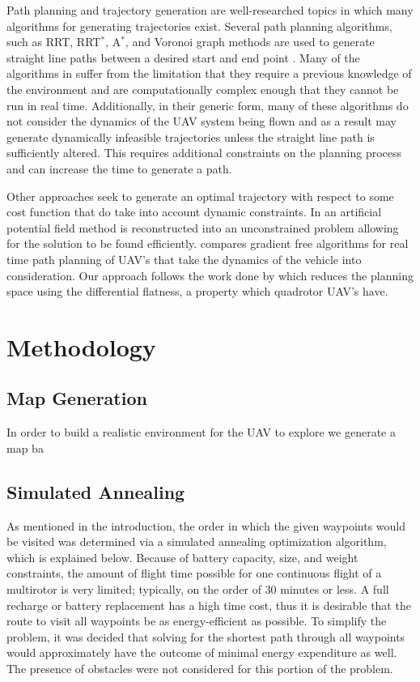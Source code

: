 \documentclass[letterpaper,conference, 10pt]{ieeeconf}
\begin{document}
Path planning and trajectory generation are well-researched topics in which many algorithms for generating trajectories exist. Several path planning algorithms, such as RRT, RRT$^*$, A$^*$, and Voronoi graph methods are used to generate straight line paths between a desired start and end point \cite{goerzen2010survey}. Many of the algorithms in \cite{goerzen2010survey} suffer from the limitation that they require a previous knowledge of the environment and are computationally complex enough that they cannot be run in real time. Additionally, in their generic form, many of these algorithms do not consider the dynamics of the UAV system being flown and as a result may generate dynamically infeasible trajectories unless the straight line path is sufficiently altered. This requires additional constraints on the planning process and can increase the time to generate a path.

Other approaches seek to generate an optimal trajectory with respect to some cost function that do take into account dynamic constraints. In \cite{chen2016uav} an artificial potential field method is reconstructed into an unconstrained problem allowing for the solution to be found efficiently. \cite{roberge2012comparison} compares gradient free algorithms for real time path planning of UAV's that take the dynamics of the vehicle into consideration. Our approach follows the work done by \cite{mellinger2011minimum} which reduces the planning space using the differential flatness, a property which quadrotor UAV's have.

\section{Methodology}
\label{section:methods}

\subsection{Map Generation}
In order to build a realistic environment for the UAV to explore we generate a map ba

\subsection{Simulated Annealing}
As mentioned in the introduction, the order in which the given waypoints would be visited was determined via a simulated annealing optimization algorithm, which is explained below. Because of battery capacity, size, and weight constraints, the amount of flight time possible for one continuous flight of a multirotor is very limited; typically, on the order of 30 minutes or less. A full recharge or battery replacement has a high time cost, thus it is desirable that the route to visit all waypoints be as energy-efficient as possible. To simplify the problem, it was decided that solving for the shortest path through all waypoints would approximately have the outcome of minimal energy expenditure as well. The presence of obstacles were not considered for this portion of the problem.
\end{document}
